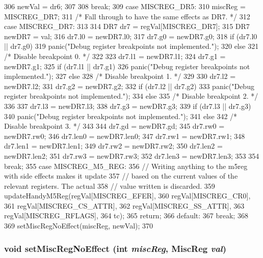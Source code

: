 \begin{DoxyCode}
{{{306             newVal = dr6;
307         }
308         break;
309       case MISCREG_DR5:
310         miscReg = MISCREG_DR7;
311         /* Fall through to have the same effects as DR7. */
312       case MISCREG_DR7:
313         {
314             DR7 dr7 = regVal[MISCREG_DR7];
315             DR7 newDR7 = val;
316             dr7.l0 = newDR7.l0;
317             dr7.g0 = newDR7.g0;
318             if (dr7.l0 || dr7.g0) {
319                 panic("Debug register breakpoints not implemented.\n");
320             } else {
321                 /* Disable breakpoint 0. */
322             }
323             dr7.l1 = newDR7.l1;
324             dr7.g1 = newDR7.g1;
325             if (dr7.l1 || dr7.g1) {
326                 panic("Debug register breakpoints not implemented.\n");
327             } else {
328                 /* Disable breakpoint 1. */
329             }
330             dr7.l2 = newDR7.l2;
331             dr7.g2 = newDR7.g2;
332             if (dr7.l2 || dr7.g2) {
333                 panic("Debug register breakpoints not implemented.\n");
334             } else {
335                 /* Disable breakpoint 2. */
336             }
337             dr7.l3 = newDR7.l3;
338             dr7.g3 = newDR7.g3;
339             if (dr7.l3 || dr7.g3) {
340                 panic("Debug register breakpoints not implemented.\n");
341             } else {
342                 /* Disable breakpoint 3. */
343             }
344             dr7.gd = newDR7.gd;
345             dr7.rw0 = newDR7.rw0;
346             dr7.len0 = newDR7.len0;
347             dr7.rw1 = newDR7.rw1;
348             dr7.len1 = newDR7.len1;
349             dr7.rw2 = newDR7.rw2;
350             dr7.len2 = newDR7.len2;
351             dr7.rw3 = newDR7.rw3;
352             dr7.len3 = newDR7.len3;
353         }
354         break;
355       case MISCREG_M5_REG:
356         // Writing anything to the m5reg with side effects makes it update
357         // based on the current values of the relevant registers. The actual
358         // value written is discarded.
359         updateHandyM5Reg(regVal[MISCREG_EFER],
360                          regVal[MISCREG_CR0],
361                          regVal[MISCREG_CS_ATTR],
362                          regVal[MISCREG_SS_ATTR],
363                          regVal[MISCREG_RFLAGS],
364                          tc);
365         return;
366       default:
367         break;
368     }
369     setMiscRegNoEffect(miscReg, newVal);
370 }
\end{DoxyCode}
\hypertarget{classX86ISA_1_1ISA_a4b021ed77b93fc971a905c83bba97e38}{
\subsubsection[{setMiscRegNoEffect}]{\setlength{\rightskip}{0pt plus 5cm}void setMiscRegNoEffect (int {\em miscReg}, \/  {\bf MiscReg} {\em val})}}
\label{classX86ISA_1_1ISA_a4b021ed77b93fc971a905c83bba97e38}



